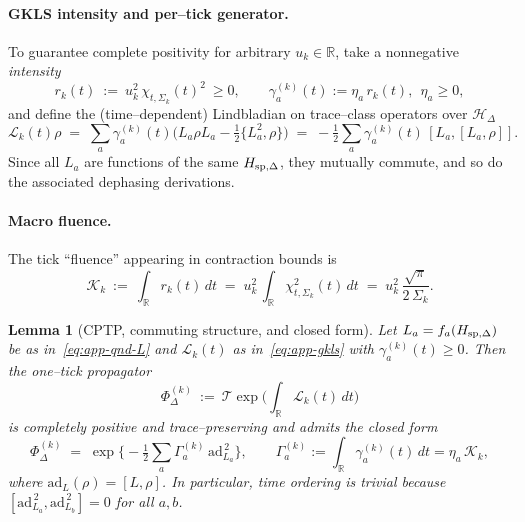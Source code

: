 \documentclass[10pt]{article}
\theoremstyle{definition}
\theoremstyle{plain}
\newtheorem{lemma}{Lemma}[section]
\begin{document}
\paragraph{GKLS intensity and per–tick generator.}\label{par:uom-main-214}
To guarantee complete positivity for arbitrary \(u_k\in\mathbb R\), take a nonnegative \emph{intensity}
\begin{equation}
r_k(t)\ :=\ u_k^2\,\chi_{t,\Sigma_k}(t)^2\ \ge 0,
\qquad \gamma_a^{(k)}(t):=\eta_a\,r_k(t),\ \ \eta_a\ge 0,
\label{eq:app-intensity}
\end{equation}
and define the (time–dependent) Lindbladian on trace–class operators over \(\mathcal H_\Delta\)
\begin{equation}
\mathcal L_k(t)\rho
\;=\;\sum_a \gamma_a^{(k)}(t)\Big(L_a\rho L_a-\tfrac12\{L_a^2,\rho\}\Big)
\;=\;-\tfrac12\sum_a \gamma_a^{(k)}(t)\,[L_a,[L_a,\rho]].
\label{eq:app-gkls}
\end{equation}
Since all \(L_a\) are functions of the same \(H_{{\rm sp},\Delta}\), they mutually commute, and so do the associated dephasing derivations.

\paragraph{Macro fluence.}\label{par:uom-main-215}
The tick ``fluence'' appearing in contraction bounds is
\begin{equation}
\mathcal K_k\ :=\ \int_{\mathbb R} r_k(t)\,dt
\;=\;u_k^2\,\int_{\mathbb R}\chi_{t,\Sigma_k}^2(t)\,dt
\;=\;u_k^2\,\frac{\sqrt{\pi}}{2\,\Sigma_k}.
\label{eq:app-fluence}
\end{equation}

\begin{lemma}[CPTP, commuting structure, and closed form]
\label{lem:app-cptp}
Let \(L_a=f_a(H_{{\rm sp},\Delta})\) be as in~\eqref{eq:app-qnd-L} and \(\mathcal L_k(t)\) as in~\eqref{eq:app-gkls} with \(\gamma_a^{(k)}(t)\ge 0\).
Then the one–tick propagator
\[
\Phi_\Delta^{(k)}\ :=\ \mathcal T\exp\!\Big(\int_{\mathbb R}\mathcal L_k(t)\,dt\Big)
\]
is completely positive and trace–preserving and admits the closed form
\begin{equation}
\Phi_\Delta^{(k)}
\;=\;\exp\!\Big\{-\tfrac12\sum_a \Gamma_a^{(k)}\,\mathrm{ad}_{L_a}^{\,2}\Big\},
\qquad
\Gamma_a^{(k)}:=\int_{\mathbb R}\gamma_a^{(k)}(t)\,dt=\eta_a\,\mathcal K_k,
\label{eq:app-phi-closed}
\end{equation}
where \(\mathrm{ad}_{L}(\rho)=[L,\rho]\). In particular, time ordering is trivial because
\([\mathrm{ad}_{L_a}^{\,2},\mathrm{ad}_{L_b}^{\,2}]=0\) for all \(a,b\).
\end{lemma}
\end{document}
